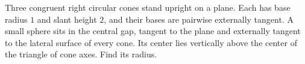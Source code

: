 Three congruent right circular cones stand upright on a plane. Each has base radius $1$ and slant height $2$, and their bases are pairwise externally tangent. A small sphere sits in the central gap, tangent to the plane and externally tangent to the lateral surface of every cone. Its center lies vertically above the center of the triangle of cone axes. Find its radius.
